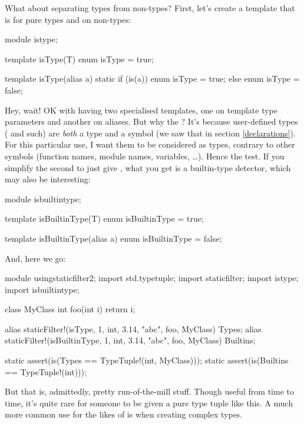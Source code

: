 What about separating types from non-types? First, let's create a template that is  for pure types and  on non-types:

\begin{dcode}
module istype;

template isType(T)
{
    enum isType = true;
}

template isType(alias a)
{
    static if (is(a))
        enum isType = true;
    else
        enum isType = false;
}
\end{dcode}

Hey, wait! OK with having two specialised templates, one on template type parameters and another on aliases. But why the ? It's because user-defined types ( and such) are \emph{both} a type and a symbol (we saw that in section \ref{declarations}). For this particular use, I want them to be considered as types, contrary to other symbols (function names, module names, variables, \ldots). Hence the \DD{()} test. If you simplify the second  to just give , what you get is a builtin-type detector, which may also be interesting:

\begin{dcode}
module isbuiltintype;

template isBuiltinType(T)
{
    enum isBuiltinType = true;
}

template isBuiltinType(alias a)
{
    enum isBuiltinType = false;
}
\end{dcode}

And, here we go:

\begin{dcode}
module usingstaticfilter2;
import std.typetuple;
import staticfilter;
import istype;
import isbuiltintype;

class MyClass {}
int foo(int i) { return i;}

alias staticFilter!(isType, 1, int, 3.14, "abc", foo, MyClass) Types;
alias staticFilter!(isBuiltinType, 1, int, 3.14, "abc", foo, MyClass) Builtins;

static assert(is(Types == TypeTuple!(int, MyClass)));
static assert(is(Builtins == TypeTuple!(int)));
\end{dcode}

But that is, admittedly, pretty run-of-the-mill stuff. Though useful from time to time, it's quite rare for someone to be given a pure type tuple like this. A much more common use for the likes of  is when creating complex types.


